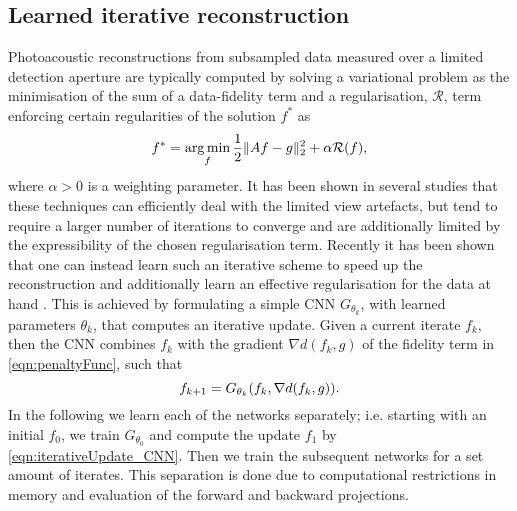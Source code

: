 \documentclass[runningheads]{llncs}
\DeclareMathOperator*{\argmin}{arg\,min}
\begin{document}
\subsection{Learned iterative reconstruction}
Photoacoustic reconstructions from subsampled data measured over a limited detection aperture are typically computed by solving a variational problem as the minimisation of the sum of a data-fidelity term and a regularisation, $\mathcal{R}$, term enforcing certain regularities of the solution $f^*$ as%
\vspace{-0.5em}
\begin{equation} \label{eqn:penaltyFunc}
f^*=\argmin_{f} \frac{1}{2}\|Af-g\|_2^2+ \alpha \mathcal{R}(f),
\vspace{-0.75em}
\end{equation}
where $\alpha>0$ is a weighting parameter. 
It has been shown in several studies \cite{Huang2013,Arridge2016,ArBeBeCoHuLuOgZh16,BoLaStGiMaBr17} that these techniques can efficiently deal with the limited view artefacts, but tend to require a larger number of iterations to converge and are additionally limited by the expressibility of the chosen regularisation term. Recently it has been shown that one can instead learn such an iterative scheme to speed up the reconstruction and additionally learn an effective regularisation for the data at hand \cite{Hammernik2018,Adler2017,Hauptmann2018}. 
This is %
achieved by formulating a simple CNN $G_{\theta_k}$, with learned parameters $\theta_k$, that computes an iterative update. Given a current iterate $f_k$, then the CNN combines $f_k$ with the gradient $\nabla d(f_k,g)$ of the fidelity term in \eqref{eqn:penaltyFunc}, such that
\vspace{-0.5em}
\begin{equation}\label{eqn:iterativeUpdate_CNN}
f_{k+1}=G_{\theta_k}(f_k,\nabla d(f_k,g)).
\vspace{-0.5em}
\end{equation}
In the following we learn each of the networks separately; i.e. starting with an initial $f_0$, we train $G_{\theta_0}$ and compute the update $f_{1}$ by \eqref{eqn:iterativeUpdate_CNN}. Then we train the subsequent networks for a set amount of iterates. This separation is done due to computational restrictions in memory and evaluation of the forward and backward projections.

\vspace{-0.5em}
\end{document}
